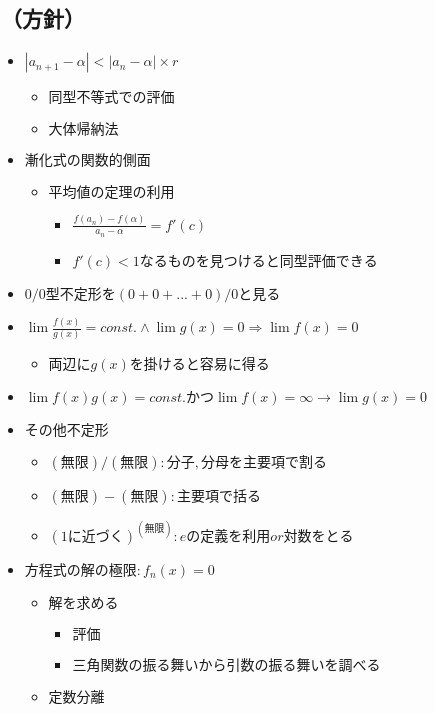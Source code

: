 \documentclass[dvipdfmx,uplatex]{jsarticle}
\begin{document}
\subsection{（方針）}
\begin{itemize}
	\item $ |a_{n+1} - α| < |a_{n} - α| \times r$
	\begin{itemize}
		\item $ 同型不等式での評価$
		\item $ 大体帰納法$
	\end{itemize}
	\item $ 漸化式の関数的側面$
	\begin{itemize}
		\item $ 平均値の定理の利用$
		\begin{itemize}
			\item $ \frac{f(a_n) - f(α)}{a_n - α} = f'(c)$
			\item $ f'(c) < 1なるものを見つけると同型評価できる$
		\end{itemize}
	\end{itemize}
	\item $ 0/0型不定形を(0+0+...+0)/0と見る$
	\item $ \lim \frac{f(x)}{g(x)} = const. ∧ \lim g(x) = 0 ⇒ \lim f(x) = 0$
	\begin{itemize}
		\item $ 両辺にg(x)を掛けると容易に得る$
	\end{itemize}
	\item $ \lim f(x)g(x) = const. かつ \lim f(x) = \infty \rightarrow \lim g(x) = 0$
	\item $ その他不定形$
	\begin{itemize}
		\item $ (無限)/(無限): 分子,分母を主要項で割る$
		\item $ (無限)-(無限): 主要項で括る$
		\item $ {(1に近づく)}^{(無限)}: eの定義を利用or対数をとる$
	\end{itemize}
	\item $ 方程式の解の極限: f_n(x) = 0$
	\begin{itemize}
		\item $ 解を求める$
		\begin{itemize}
			\item $ 評価$
			\item $ 三角関数の振る舞いから引数の振る舞いを調べる$
		\end{itemize}
		\item $ 定数分離$

\end{itemize}
\end{itemize}
\end{document}
